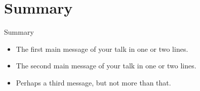 \documentclass{beamer}
\begin{document}
\section*{Summary}

\begin{frame}{Summary}
  \begin{itemize}
  \item
    The \alert{first main message} of your talk in one or two lines.
  \item
    The \alert{second main message} of your talk in one or two lines.
  \item
    Perhaps a \alert{third message}, but not more than that.
  \end{itemize}
\end{frame}
\end{document}
